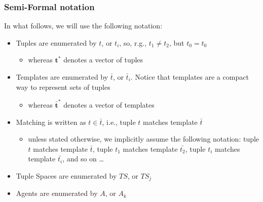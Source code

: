 \documentclass[presentation]{beamer}\mode<presentation>{\usetheme{AMSCesenaPurpleAndGold}}
\begin{document}
\begin{frame}%
\frametitle{Semi-Formal notation}

	In what follows, we will use the following notation:
	\vfill
	\begin{itemize}
		\item Tuples are enumerated by \alert{$t$}, or $t_i$, so, r.g., $t_1 \neq t_2$, but $t_0 = t_0$
		\begin{itemize}
			\item whereas $\mathbf{t}^*$ denotes a vector of tuples
		\end{itemize}

		\vfill

		\item Templates are enumerated by \alert{$\bar{t}$}, or $\bar{t}_i$. Notice that templates are a compact way to represent \alert{sets} of tuples
		\begin{itemize}
			\item whereas $\bar{\mathbf{t}}^*$ denotes a vector of templates
		\end{itemize}

		\vfill

		\item Matching is written as \alert{$t \in \bar{t}$}, i.e., tuple $t$ matches template $\bar{t}$
		\begin{itemize}
			\item unless stated otherwise, we implicitly assume the following notation: tuple $t$ matches template $\bar{t}$, tuple $t_1$ matches template $\bar{t_2}$, tuple $t_i$ matches template $\bar{t_i}$, and so on \ldots
		\end{itemize}

		\vfill

		\item Tuple Spaces are enumerated by \alert{$TS$}, or $TS_j$

		\vfill

		\item Agents are enumerated by \alert{$A$}, or $A_k$
	\end{itemize}

\end{frame}
\end{document}
